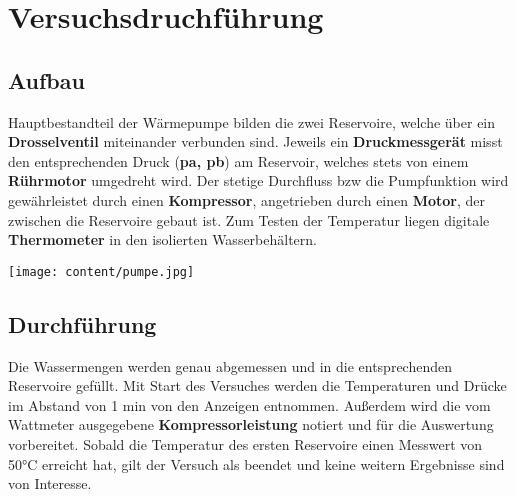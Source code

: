\section{Versuchsdruchführung}
\label{sec:Versuchsdruchführung}





\noindent\begin{minipage}{0.5\textwidth}
\subsection{Aufbau}
\label{sec:Aufbau}
Hauptbestandteil der Wärmepumpe bilden die zwei Reservoire, welche über ein  \\
\textbf{Drosselventil} miteinander verbunden sind. Jeweils ein \textbf{Druckmessgerät} misst 
den entsprechenden Druck (\textbf{pa, pb}) am Reservoir, welches stets von einem \textbf{Rührmotor} umgedreht wird.
Der stetige Durchfluss bzw die Pumpfunktion wird gewährleistet durch einen \textbf{Kompressor}, angetrieben durch einen \textbf{Motor}, %
 der zwischen die Reservoire gebaut ist. Zum Testen der Temperatur liegen digitale 
\textbf{Thermometer} in den isolierten Wasserbehältern.
\end{minipage}
\hfill
\begin{minipage}{0.5\textwidth}\raggedleft
\vspace{2cm}
\texttt{[image: content/pumpe.jpg]}

\end{minipage}


\subsection{Durchführung}
\label{sec:Durchfuehrung}
Die Wassermengen werden genau abgemessen und in die entsprechenden Reservoire gefüllt. %
Mit Start des Versuches werden die Temperaturen und Drücke im Abstand von 1 min von den Anzeigen entnommen. Außerdem wird die vom Wattmeter ausgegebene \textbf{Kompressorleistung} notiert und für 
die Auswertung vorbereitet. Sobald die Temperatur des ersten Reservoire einen Messwert von 50°C erreicht hat, gilt der Versuch als beendet und keine weitern Ergebnisse sind von Interesse.
